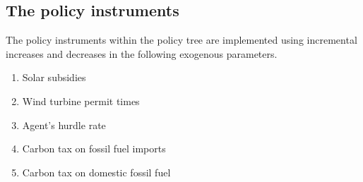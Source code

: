 
\subsection{The policy instruments}
\label{ssec:interfaceInstruments}

The policy instruments within the policy tree are implemented using incremental increases and decreases in the following exogenous parameters.

\begin{enumerate}
\item Solar subsidies
\item Wind turbine permit times
\item Agent's hurdle rate
\item Carbon tax on fossil fuel imports
\item Carbon tax on domestic fossil fuel
\end{enumerate}










